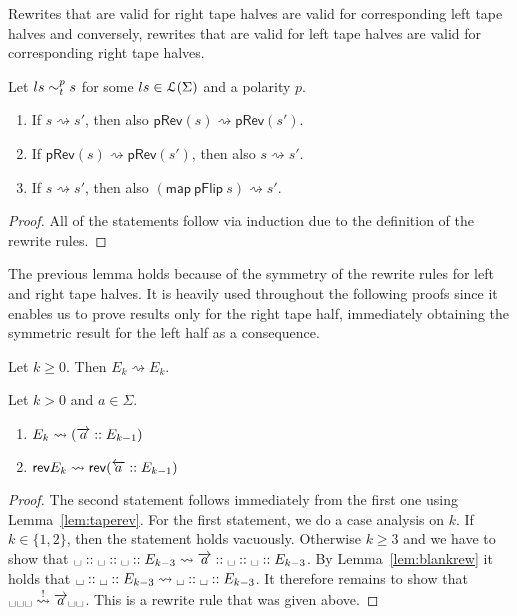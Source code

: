\documentclass[a4paper,UKenglish,cleveref, autoref]{lipics-v2019}
\newcommand{\strent}{\rightsquigarrow}
\newcommand{\constrent}{\overset{!}{\rightsquigarrow}}
\begin{document}
\newcommand*{\pRev}[1]{\textsf{pRev}(#1)}

\begin{lemma}\label{lem:taperev}
  Rewrites that are valid for right tape halves are valid for corresponding left tape halves and conversely, rewrites that are valid for left tape halves are valid for corresponding right tape halves.

  Let $ls \sim_t^{p} s$ for some $ls \in \mathcal{L} (\Sigma)$ and a polarity $p$.
  \begin{enumerate}
    \item If $s \strent{} s'$, then also $\pRev{s} \strent{} \pRev{s'}$. 
    \item If $\pRev{s} \strent{} \pRev{s'}$, then also $s \strent{} s'$. 
    \item If $s \strent{} s'$, then also $(\textsf{map}~\textsf{pFlip}~s) \strent{} s'$. 
  \end{enumerate}
\end{lemma}
\begin{proof}
  All of the statements follow via induction due to the definition of the rewrite rules.
\end{proof}

The previous lemma holds because of the symmetry of the rewrite rules for left and right tape halves. It is heavily used throughout the following proofs since it enables us to prove results only for the right tape half, immediately obtaining the symmetric result for the left half as a consequence.

\begin{lemma}\label{lem:blankrew}
  Let $k \ge 0$. Then $E_k \strent{} E_k$. 
\end{lemma}

\begin{lemma}\label{lem:blankshiftin}
  Let $k > 0$ and $a \in \Sigma$. 
  \begin{enumerate}
    \item $E_k \strent{} (\polpos{a} :: E_{k-1})$
    \item $\rev{E_k} \strent{} \rev{(\polneg{a} :: E_{k-1})}$
  \end{enumerate}
\end{lemma}
\begin{proof}
  The second statement follows immediately from the first one using Lemma~\ref{lem:taperev}.
  For the first statement, we do a case analysis on $k$. If $k \in \{1, 2\}$, then the statement holds vacuously. 
  Otherwise $k \ge 3$ and we have to show that $\blank :: \blank :: \blank :: E_{k-3} \strent{} \polpos{a} :: \blank :: \blank :: E_{k-3}$. By Lemma~\ref{lem:blankrew} it holds that $\blank :: \blank :: E_{k-3} \strent{} \blank :: \blank :: E_{k-3}$. It therefore remains to show that $\blank\blank\blank \constrent{} \polpos{a}\blank\blank$. This is a rewrite rule that was given above.
\end{proof}
\end{document}
